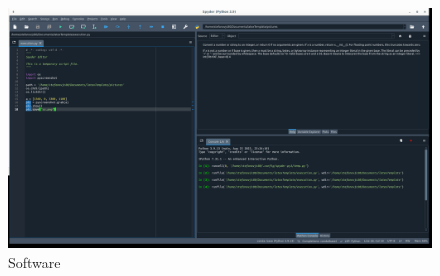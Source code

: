 \begin{figure}[h!]		
	\centering
   	\includegraphics[width=8.0in]{pictures/ss.png}%
  	\caption{Software}
   	\label{fig:graficoST_unAcce}
\end{figure}